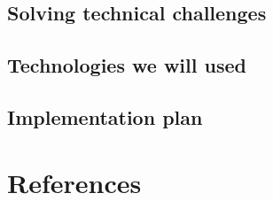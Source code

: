 \documentclass[11pt,a4paper,titlepage]{article}
\begin{document}
	\subsection{Solving technical challenges}
	

	\subsection{Technologies we will used}
	
	
	\subsection{Implementation plan}
	
	
\pagebreak

\section{References}


\end{document}

